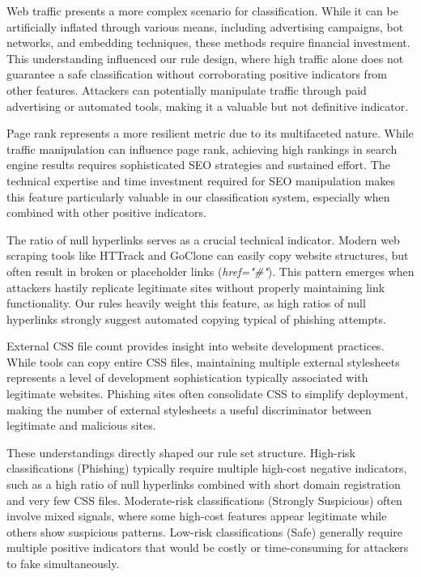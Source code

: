 \documentclass{article}
\begin{document}
Web traffic presents a more complex scenario for classification. While it can be artificially inflated through various means, including advertising campaigns, bot networks, and embedding techniques, these methods require financial investment. This understanding influenced our rule design, where high traffic alone does not guarantee a safe classification without corroborating positive indicators from other features. Attackers can potentially manipulate traffic through paid advertising or automated tools, making it a valuable but not definitive indicator.

Page rank represents a more resilient metric due to its multifaceted nature. While traffic manipulation can influence page rank, achieving high rankings in search engine results requires sophisticated SEO strategies and sustained effort. The technical expertise and time investment required for SEO manipulation makes this feature particularly valuable in our classification system, especially when combined with other positive indicators.

The ratio of null hyperlinks serves as a crucial technical indicator. Modern web scraping tools like HTTrack \cite{httrack} and GoClone \cite{goclone} can easily copy website structures, but often result in broken or placeholder links (\textit{href="\#"}). This pattern emerges when attackers hastily replicate legitimate sites without properly maintaining link functionality. Our rules heavily weight this feature, as high ratios of null hyperlinks strongly suggest automated copying typical of phishing attempts.

External CSS file count provides insight into website development practices. While tools can copy entire CSS files, maintaining multiple external stylesheets represents a level of development sophistication typically associated with legitimate websites. Phishing sites often consolidate CSS to simplify deployment, making the number of external stylesheets a useful discriminator between legitimate and malicious sites.

These understandings directly shaped our rule set structure. High-risk classifications (Phishing) typically require multiple high-cost negative indicators, such as a high ratio of null hyperlinks combined with short domain registration and very few CSS files. Moderate-risk classifications (Strongly Suspicious) often involve mixed signals, where some high-cost features appear legitimate while others show suspicious patterns. Low-risk classifications (Safe) generally require multiple positive indicators that would be costly or time-consuming for attackers to fake simultaneously.
\end{document}
